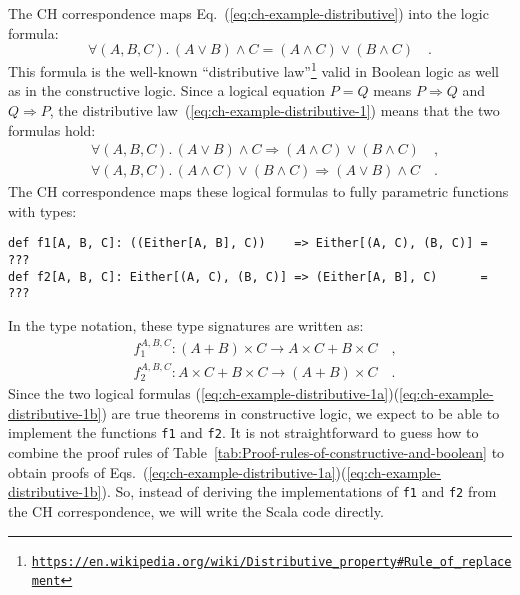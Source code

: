 The CH correspondence maps Eq.~(\ref{eq:ch-example-distributive})
into the logic formula:
\begin{equation}
\forall(A,B,C).\,\left(A\vee B\right)\wedge C=\left(A\wedge C\right)\vee\left(B\wedge C\right)\quad.\label{eq:ch-example-distributive-1}
\end{equation}
This formula is the well-known \textsf{``}distributive law\textsf{''}\footnote{\texttt{\href{https://en.wikipedia.org/wiki/Distributive_property\#Rule_of_replacement}{https://en.wikipedia.org/wiki/Distributive\_property\#Rule\_of\_replacement}}}
valid in Boolean logic as well as in the constructive logic. Since
a logical equation $P=Q$ means $P\Rightarrow Q$ and $Q\Rightarrow P$,
the distributive law~(\ref{eq:ch-example-distributive-1}) means
that the two formulas hold:
\begin{align}
 & \forall(A,B,C).\,\left(A\vee B\right)\wedge C\Rightarrow\left(A\wedge C\right)\vee\left(B\wedge C\right)\quad,\label{eq:ch-example-distributive-1a}\\
 & \forall(A,B,C).\,\left(A\wedge C\right)\vee\left(B\wedge C\right)\Rightarrow\left(A\vee B\right)\wedge C\quad.\label{eq:ch-example-distributive-1b}
\end{align}
The CH correspondence maps these logical formulas to fully parametric
functions with types:
\begin{lstlisting}
def f1[A, B, C]: ((Either[A, B], C))    => Either[(A, C), (B, C)] = ???
def f2[A, B, C]: Either[(A, C), (B, C)] => (Either[A, B], C)      = ???
\end{lstlisting}
In the type notation, these type signatures are written as:
\begin{align*}
 & f_{1}^{A,B,C}:\left(A+B\right)\times C\rightarrow A\times C+B\times C\quad,\\
 & f_{2}^{A,B,C}:A\times C+B\times C\rightarrow\left(A+B\right)\times C\quad.
\end{align*}
Since the two logical formulas (\ref{eq:ch-example-distributive-1a})\textendash (\ref{eq:ch-example-distributive-1b})
are true theorems in constructive logic, we expect to be able to implement
the functions \lstinline!f1! and \lstinline!f2!. It is not straightforward
to guess how to combine the proof rules of Table~\ref{tab:Proof-rules-of-constructive-and-boolean}
to obtain proofs of Eqs.~(\ref{eq:ch-example-distributive-1a})\textendash (\ref{eq:ch-example-distributive-1b}).
So, instead of deriving the implementations of \lstinline!f1! and
\lstinline!f2! from the CH correspondence, we will write the Scala
code directly.

